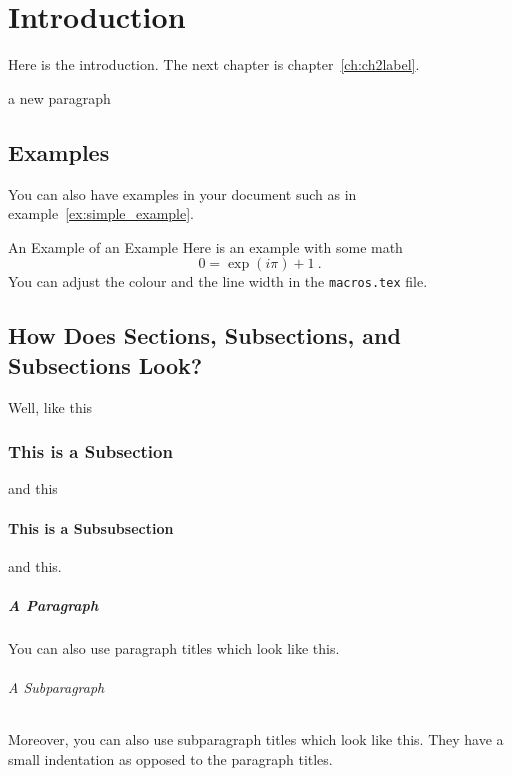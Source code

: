 \chapter{Introduction}\label{ch:introduction}
Here is the introduction. The next chapter is chapter~\ref{ch:ch2label}.


a new paragraph


\section{Examples}
You can also have examples in your document such as in example~\ref{ex:simple_example}.
\begin{example}{An Example of an Example}
  \label{ex:simple_example}
  Here is an example with some math
  \begin{equation}
    0 = \exp(i\pi)+1\ .
  \end{equation}
  You can adjust the colour and the line width in the {\tt macros.tex} file.
\end{example}

\section{How Does Sections, Subsections, and Subsections Look?}
Well, like this
\subsection{This is a Subsection}
and this
\subsubsection{This is a Subsubsection}
and this.

\paragraph{A Paragraph}
You can also use paragraph titles which look like this.

\subparagraph{A Subparagraph} Moreover, you can also use subparagraph titles which look like this. They have a small indentation as opposed to the paragraph titles.

